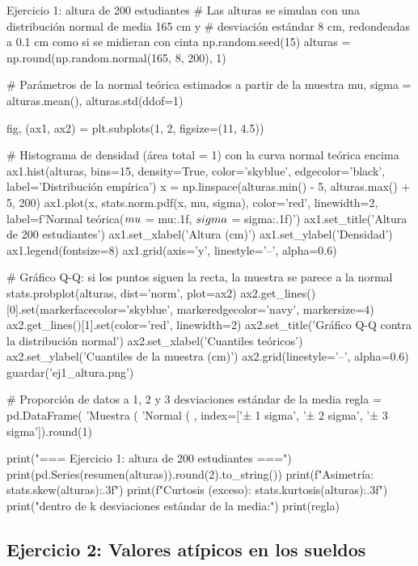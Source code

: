 \documentclass[11pt,letterpaper]{article}
\begin{document}
\begin{codigo}[label=cod:ej1]{Ejercicio 1: altura de 200 estudiantes}
# Las alturas se simulan con una distribución normal de media 165 cm y
# desviación estándar 8 cm, redondeadas a 0.1 cm como si se midieran con cinta
np.random.seed(15)
alturas = np.round(np.random.normal(165, 8, 200), 1)

# Parámetros de la normal teórica estimados a partir de la muestra
mu, sigma = alturas.mean(), alturas.std(ddof=1)

fig, (ax1, ax2) = plt.subplots(1, 2, figsize=(11, 4.5))

# Histograma de densidad (área total = 1) con la curva normal teórica encima
ax1.hist(alturas, bins=15, density=True, color='skyblue', edgecolor='black',
         label='Distribución empírica')
x = np.linspace(alturas.min() - 5, alturas.max() + 5, 200)
ax1.plot(x, stats.norm.pdf(x, mu, sigma), color='red', linewidth=2,
         label=f'Normal teórica\n($\\mu$ = {mu:.1f}, $\\sigma$ = {sigma:.1f})')
ax1.set_title('Altura de 200 estudiantes')
ax1.set_xlabel('Altura (cm)')
ax1.set_ylabel('Densidad')
ax1.legend(fontsize=8)
ax1.grid(axis='y', linestyle='--', alpha=0.6)

# Gráfico Q-Q: si los puntos siguen la recta, la muestra se parece a la normal
stats.probplot(alturas, dist='norm', plot=ax2)
ax2.get_lines()[0].set(markerfacecolor='skyblue', markeredgecolor='navy', markersize=4)
ax2.get_lines()[1].set(color='red', linewidth=2)
ax2.set_title('Gráfico Q-Q contra la distribución normal')
ax2.set_xlabel('Cuantiles teóricos')
ax2.set_ylabel('Cuantiles de la muestra (cm)')
ax2.grid(linestyle='--', alpha=0.6)
guardar('ej1_altura.png')

# Proporción de datos a 1, 2 y 3 desviaciones estándar de la media
regla = pd.DataFrame({
    'Muestra (%
    'Normal (%
}, index=['± 1 sigma', '± 2 sigma', '± 3 sigma']).round(1)

print("=== Ejercicio 1: altura de 200 estudiantes ===")
print(pd.Series(resumen(alturas)).round(2).to_string())
print(f"Asimetría: {stats.skew(alturas):.3f}")
print(f"Curtosis (exceso): {stats.kurtosis(alturas):.3f}")
print("\nDatos dentro de k desviaciones estándar de la media:")
print(regla)
\end{codigo}

\subsection{Ejercicio 2: Valores atípicos en los sueldos}
\end{document}
